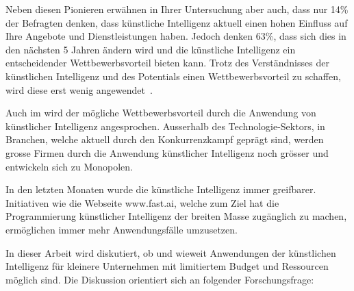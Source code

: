 Neben diesen Pionieren erwähnen \textcite{Ransbotham2017} in Ihrer Untersuchung aber auch, dass nur 14\% der Befragten denken, dass künstliche Intelligenz aktuell einen hohen Einfluss auf Ihre Angebote und Dienstleistungen haben. Jedoch denken 63\%, dass sich dies in den nächsten 5 Jahren ändern wird und die künstliche Intelligenz ein entscheidender Wettbewerbsvorteil bieten kann. Trotz des Verständnisses der künstlichen Intelligenz und des Potentials einen Wettbewerbsvorteil zu schaffen, wird diese erst wenig angewendet~\autocite{Ransbotham2017}.

Auch im \textcite{TheEconomist2018} wird der mögliche Wettbewerbsvorteil durch die Anwendung von künstlicher Intelligenz angesprochen. Ausserhalb des Technologie-Sektors, in Branchen, welche aktuell durch den Konkurrenzkampf geprägt sind, werden grosse Firmen durch die Anwendung künstlicher Intelligenz noch grösser und entwickeln sich zu Monopolen.

In den letzten Monaten wurde die künstliche Intelligenz immer greifbarer. Initiativen wie die Webseite www.fast.ai, welche zum Ziel hat die Programmierung künstlicher Intelligenz der breiten Masse zugänglich zu machen, ermöglichen immer mehr Anwendungsfälle umzusetzen.

In dieser Arbeit wird diskutiert, ob und wieweit Anwendungen der künstlichen Intelligenz für kleinere Unternehmen mit limitiertem Budget und Ressourcen möglich sind. Die Diskussion orientiert sich an folgender Forschungsfrage:

{
    \medskip
    \setlength{\fboxsep}{1em}
    \noindent{}
    \medskip
}





